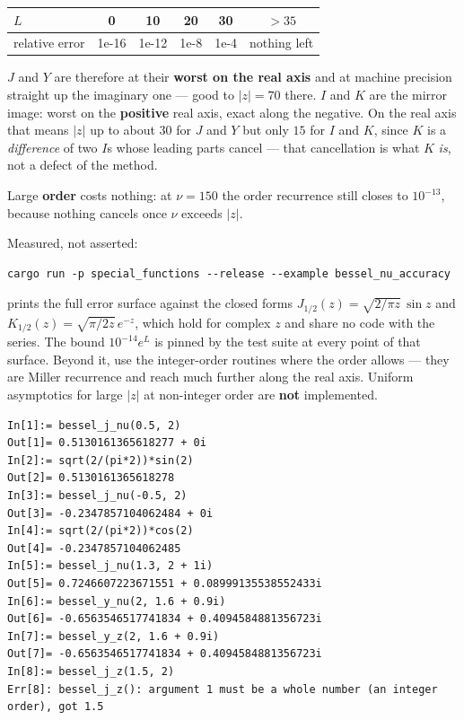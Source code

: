 \documentclass[11pt]{article}
\begin{document}
\begin{center}
\begin{tabular}{l|ccccc}
$L$ & 0 & 10 & 20 & 30 & $>35$\\
\hline
relative error & 1e-16 & 1e-12 & 1e-8 & 1e-4 & nothing left\\
\end{tabular}
\end{center}

$J$ and $Y$ are therefore at their \textbf{worst on the real axis} and
at machine precision straight up the imaginary one --- good to $|z|=70$
there. $I$ and $K$ are the mirror image: worst on the \textbf{positive}
real axis, exact along the negative. On the real axis that means $|z|$
up to about $30$ for $J$ and $Y$ but only $15$ for $I$ and $K$, since
$K$ is a \emph{difference} of two $I$s whose leading parts cancel ---
that cancellation is what $K$ \emph{is}, not a defect of the method.

Large \textbf{order} costs nothing: at $\nu = 150$ the order recurrence
still closes to $10^{-13}$, because nothing cancels once $\nu$ exceeds
$|z|$.

Measured, not asserted:
\begin{lstlisting}
cargo run -p special_functions --release --example bessel_nu_accuracy
\end{lstlisting}
prints the full error surface against the closed forms
$J_{1/2}(z)=\sqrt{2/\pi z}\,\sin z$ and
$K_{1/2}(z)=\sqrt{\pi/2z}\,e^{-z}$, which hold for complex $z$ and
share no code with the series. The bound $10^{-14}e^{L}$ is pinned by
the test suite at every point of that surface. Beyond it, use the
integer-order routines where the order allows --- they are Miller
recurrence and reach much further along the real axis. Uniform
asymptotics for large $|z|$ at non-integer order are \textbf{not}
implemented.

\begin{lstlisting}
In[1]:= bessel_j_nu(0.5, 2)
Out[1]= 0.5130161365618277 + 0i
In[2]:= sqrt(2/(pi*2))*sin(2)
Out[2]= 0.5130161365618278
In[3]:= bessel_j_nu(-0.5, 2)
Out[3]= -0.2347857104062484 + 0i
In[4]:= sqrt(2/(pi*2))*cos(2)
Out[4]= -0.2347857104062485
In[5]:= bessel_j_nu(1.3, 2 + 1i)
Out[5]= 0.7246607223671551 + 0.08999135538552433i
In[6]:= bessel_y_nu(2, 1.6 + 0.9i)
Out[6]= -0.6563546517741834 + 0.4094584881356723i
In[7]:= bessel_y_z(2, 1.6 + 0.9i)
Out[7]= -0.6563546517741834 + 0.4094584881356723i
In[8]:= bessel_j_z(1.5, 2)
Err[8]: bessel_j_z(): argument 1 must be a whole number (an integer order), got 1.5
\end{lstlisting}
\end{document}
